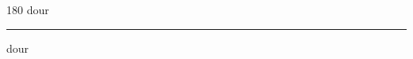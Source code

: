 
\begin{frame}
\begin{center}
\begin{turn}{180}
{\fontsize{2.5cm}{1em}\selectfont dour}
\end{turn}
\vspace{1em}\par  
\hrule
\vspace{1em}\par  
{\fontsize{2.5cm}{1em}\selectfont dour}
\end{center}
\end{frame}
